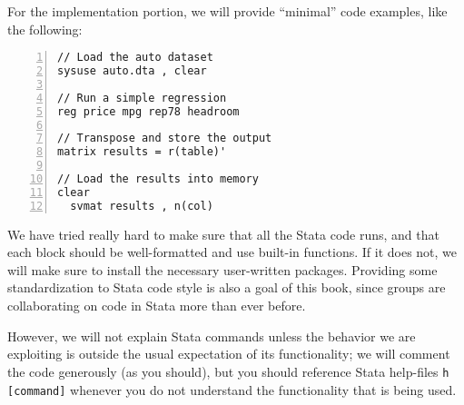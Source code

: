 For the implementation portion, we will provide ``minimal'' code examples, like the following:


\begin{Verbatim}[frame=lines,numbers=left,label=code.do]
// Load the auto dataset
sysuse auto.dta , clear

// Run a simple regression
reg price mpg rep78 headroom

// Transpose and store the output
matrix results = r(table)'

// Load the results into memory
clear
  svmat results , n(col)
\end{Verbatim}

We have tried really hard to make sure that all the Stata code runs,
and that each block should be well-formatted and use built-in functions.
If it does not, we will make sure to install the necessary user-written packages.
Providing some standardization to Stata code style is also a goal of this book,
since groups are collaborating on code in Stata more than ever before.

However, we will not explain Stata commands unless the behavior we are exploiting
is outside the usual expectation of its functionality;
we will comment the code generously (as you should),
but you should reference Stata help-files \texttt{h [command]}
whenever you do not understand the functionality that is being used.



\mainmatter
